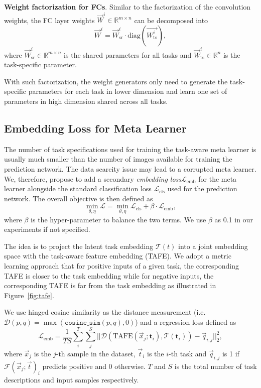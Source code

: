 \documentclass[10pt,twocolumn,letterpaper]{article}
\renewcommand{\vec}[1]{\mathbf{#1}}
\newcommand\minisection[1]{\vspace{2mm}\noindent \textbf{#1}}
\begin{document}
\minisection{Weight factorization for FCs}. 
Similar to the factorization of the convolution weights,
the FC layer weights $\Vec{W}^i\in\mathbb{R}^{m\times n}$ can be decomposed into 
\begin{equation}
    \Vec{W}^i = \Vec{W}^i_\text{sr} \cdot \text{diag}(\Vec{W^i_\text{ts}}),
\end{equation}
where $ \Vec{W}^i_\text{sr}\in\mathbb{R}^{m\times n}$ is the shared parameters for
all tasks and $\Vec{W}^i_\text{ts}\in\mathbb{R}^{n}$ is the task-specific parameter.

With such factorization, the weight generators only need to generate the 
task-specific parameters for each task in lower dimension and learn one set of
parameters in high dimension shared across all tasks. 

\subsection{Embedding Loss for Meta Learner}
The number of task specifications used for training the
task-aware meta learner is usually much smaller than the number of images available
for training the prediction network. The data scarcity issue may lead to a 
corrupted meta learner. We, therefore, propose to add a secondary \textit{embedding
loss}$\mathcal{L}_\text{emb}$ for the meta learner alongside the standard classification loss $\mathcal{L}_\text{cls}$ used for the 
prediction network. The overall objective is then defined as 
\begin{equation}
    \min_{\theta, \eta} \mathcal{L} = \min_{\theta, \eta} \mathcal{L}_\text{cls}
    + \beta \cdot \mathcal{L}_\text{emb},
\end{equation}
where $\beta$ is the hyper-parameter to balance the two terms. We use $\beta$
as 0.1 in our experiments if not specified. 

The idea is to project the latent task embedding $\mathcal{T}(t)$ into a
joint embedding space with the task-aware feature embedding (TAFE). We adopt a metric learning approach that for positive inputs of a
given task, 
the corresponding TAFE is 
closer to the task embedding while for negative inputs, the corresponding TAFE is
far from the task embedding as illustrated in Figure~\ref{fig:tafe}.

We use hinged cosine similarity as the distance measurement  
(i.e. $\mathcal{D}(p, q) = \max(\texttt{cosine\_sim}(p, q), 0)$)  and a regression
loss defined as 
\begin{equation}
    \mathcal{L}_\text{emb} =\frac{1}{TS} \sum_i^T\sum_j^S{||\mathcal{D}(\text{TAFE}(\Vec{x}_j; \vec{t}_i), \mathcal{T}(\vec{t}_i)) - \Vec{q}_{i,j}||_2^2},
\end{equation}
where $\Vec{x}_j$ is the $j\text{-th}$ sample in the dataset, $\Vec{t}_i$ is 
the $i\text{-th}$ task and $\Vec{q}_{i,j}$ is 1 if $\mathcal{F}(\Vec{x}_j; \Vec{t})_i$ predicts positive and 0 otherwise.
$T$ and $S$ is the total number of task descriptions and input samples respectively.
\end{document}
